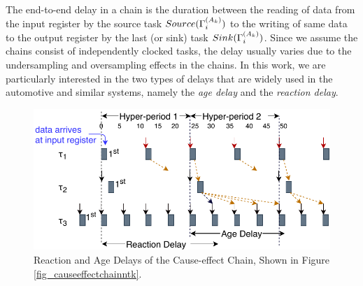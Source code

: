 The end-to-end delay in a chain is the duration between the reading of data from the input register by the source task $Source(\sss{\Gamma})$ to the writing of same data to the output register by the last (or sink) task $Sink(\sss{\Gamma})$. Since we assume the chains consist of independently clocked tasks, the delay usually varies due to the undersampling and oversampling effects in the chains. In this work, we are particularly interested in the two types of delays that are widely used in the automotive and similar systems, namely the \textit{age delay} and the \textit{reaction delay}. 
\begin{figure}
	\centering
	\includegraphics[width=0.9\linewidth]{img/timedchain_ntk}
	\caption{Reaction and Age Delays of the Cause-effect Chain, Shown in Figure {\ref{fig_causeeffectchainntk}}.}
	\label{fig_timedchainntk}
\end{figure}

